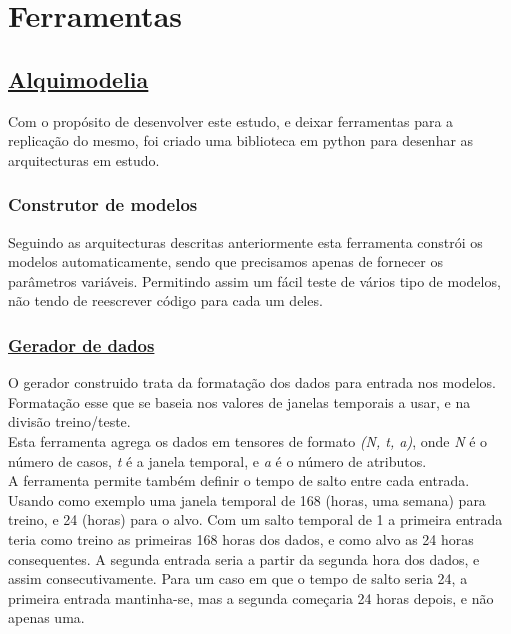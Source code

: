\chapter{Ferramentas}

\section{\href{https://github.com/alquimodelia/alquimodelia}{Alquimodelia}\label{se:alquimodelia}}


Com o propósito de desenvolver este estudo, e deixar ferramentas para a replicação do mesmo, foi criado uma biblioteca em python para desenhar as arquitecturas em estudo.\\

\subsection{Construtor de modelos}

Seguindo as arquitecturas descritas anteriormente esta ferramenta constrói os modelos automaticamente, sendo que precisamos apenas de fornecer os parâmetros variáveis. Permitindo assim um fácil teste de vários tipo de modelos, não tendo de reescrever código para cada um deles.\\

\subsection{\href{https://github.com/alquimodelia/alquitable/blob/main/alquitable/generator.py}{Gerador de dados}}

O gerador construido trata da formatação dos dados para entrada nos modelos. Formatação esse que se baseia nos valores de janelas temporais a usar, e na divisão treino/teste.\\
Esta ferramenta agrega os dados em tensores de formato \textit{(N, t, a)}, onde \textit{N} é o número de casos, \textit{t} é a janela temporal, e \textit{a} é o número de atributos.\\
A ferramenta permite também definir o tempo de salto entre cada entrada.\\
Usando como exemplo uma janela temporal de 168 (horas, uma semana) para treino, e 24 (horas) para o alvo. Com um salto temporal de 1 a primeira entrada teria como treino as primeiras 168 horas dos dados, e como alvo as 24 horas consequentes. A segunda entrada seria a partir da segunda hora dos dados, e assim consecutivamente. Para um caso em que o tempo de salto seria 24, a primeira entrada mantinha-se, mas a segunda começaria 24 horas depois, e não apenas uma.\\

